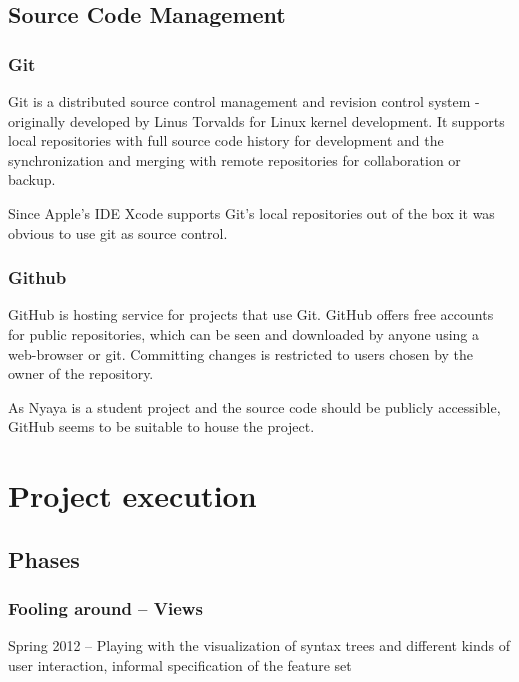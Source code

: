 \subsection{Source Code Management}
\label{sec:SCM}




\subsubsection{Git}

Git \cite{Git:Main} is a distributed source control management and revision control system 
- originally developed by Linus Torvalds for Linux kernel development. 
It supports local repositories with full source code history for development 
and the synchronization and merging with remote repositories for collaboration or backup. 
\cite{Chacon:2009:PG:1618548} 

Since Apple's IDE Xcode supports Git's local repositories out of the box it was obvious to use git as source control.

\subsubsection{Github}

GitHub \cite{GitHub:Main} is hosting service for projects that use Git. 
GitHub offers free accounts for public repositories, 
which can be seen and downloaded by anyone
using a web-browser or git.
Committing changes is restricted to users chosen by the owner of the repository.


As Nyaya is a student project and the source code should be publicly accessible,
GitHub seems to be suitable to house the project.

\section{Project execution}

\subsection{Phases}

\subsubsection{Fooling around – Views}

Spring 2012 – Playing with the visualization of syntax trees and different kinds of user interaction, informal specification of the feature set

